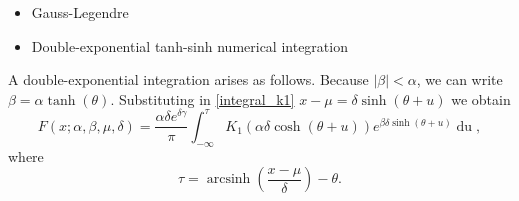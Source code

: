 \documentclass[10pt,a4paper,oneside]{article}
\DeclareMathOperator{\arcsinh}{arcsinh}
\numberwithin{equation}{section}
\begin{document}
\begin{itemize}
\item Gauss-Legendre
\item Double-exponential tanh-sinh numerical integration
\end{itemize}

A double-exponential integration arises as follows. Because $|\beta| < \alpha$, we can write $\beta = \alpha \tanh(\theta)$. Substituting in \eqref{integral_k1} $x-\mu = \delta \sinh(\theta + u)$ we obtain
\begin{equation}
F(x; \alpha, \beta, \mu, \delta) = \frac{\alpha \delta e^{\delta \gamma}}{\pi} \int_{-\infty}^{\tau} K_1 \left(\alpha \delta \cosh(\theta + u)\right) e^{\beta \delta \sinh(\theta + u)} \mathop{du},
\end{equation}
where
\begin{equation}
\tau = \arcsinh\left(\frac{x - \mu}{\delta}\right) - \theta.
\end{equation}


%
\end{document}
